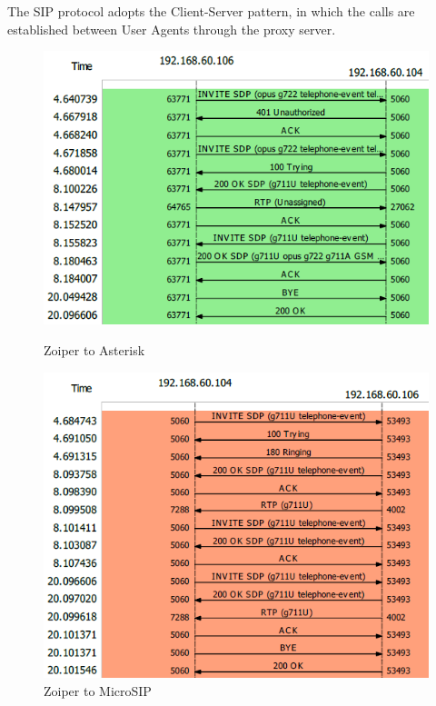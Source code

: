 The SIP protocol adopts the Client-Server pattern, in which the calls are established between User Agents through the proxy server.


\begin{figure}[htbp]
  \centering
  \begin{minipage}[b]{0.3\textwidth}
    \includegraphics[width=\textwidth]{Images/experiment/a1.png}
    \caption{Zoiper to Asterisk}
  \end{minipage}
  \hfill
  \begin{minipage}[b]{0.3\textwidth}
    \includegraphics[width=\textwidth]{Images/experiment/a2.png}
    \caption{Zoiper to MicroSIP}
  \end{minipage}
\end{figure}

